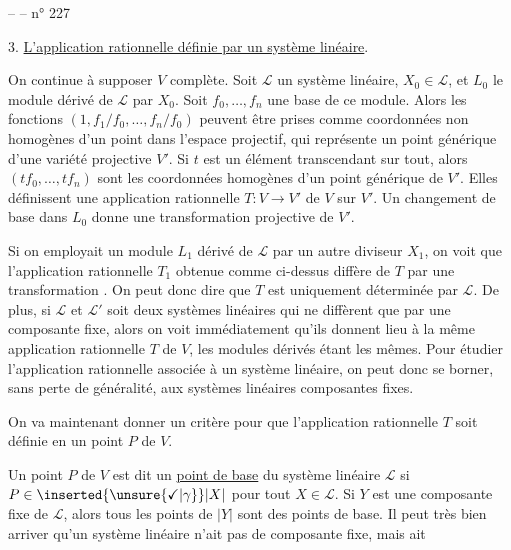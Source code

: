 
--  -- \hfill n° 227

3. \uline{L'application rationnelle définie par un système linéaire}.

On continue à supposer $V$ complète. Soit $\mathcal L$ un système linéaire, $X_0\in\mathcal L$, et $L_0$ le module dérivé de $\mathcal L$ par $X_0$. Soit $f_0,\ldots,f_n$ une base de ce module. Alors les fonctions $(1,f_1/f_0,\ldots,f_n/f_0)$ peuvent être prises comme coordonnées non homogènes d'un point dans l'espace projectif, qui représente un point générique d'une variété projective $V'$. Si $t$ est un élément transcendant sur tout, alors $(tf_0,\ldots,tf_n)$ sont les coordonnées homogènes d'un point générique de $V'$. Elles définissent une application rationnelle $T:V\longrightarrow V'$ de $V$ sur $V'$. Un changement de base dans $L_0$ donne une transformation projective de $V'$.

Si on employait un module $L_1$ dérivé de $\mathcal L$ par un autre diviseur $X_1$, on voit que l'application rationnelle $T_1$ obtenue comme ci-dessus diffère de $T$ par une transformation . On peut donc dire que $T$ est uniquement déterminée par $\mathcal L$. De plus, si $\mathcal L$ et $\mathcal L'$ soit deux systèmes linéaires qui ne diffèrent que par une composante fixe, alors on voit immédiatement qu'ils donnent lieu à la même application rationnelle $T$ de $V$, les modules dérivés étant les mêmes. Pour étudier l'application rationnelle associée à un système linéaire, on peut donc se borner, sans perte de généralité, aux systèmes linéaires  composantes fixes.


On va maintenant donner un critère pour que l'application rationnelle $T$ soit définie en un point $P$ de $V$.

Un point $P$ de $V$ est dit un \uline{point de base} du système linéaire $\mathcal L$ si $P\in\inserted{\unsure{\checkmark|\gamma}}|X|$ pour tout $X\in\mathcal L$. Si $Y$ est une composante fixe de $\mathcal L$, alors tous les points de $|Y|$ sont des points de base. Il peut très bien arriver qu'un système linéaire n'ait pas de composante fixe, mais ait

